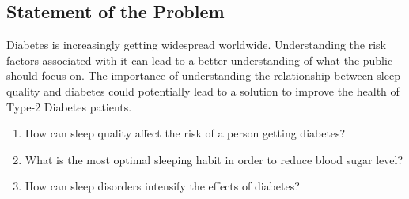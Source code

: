 \subsection*{Statement of the Problem}

Diabetes is increasingly getting widespread worldwide. Understanding the risk
factors associated with it can lead to a better understanding of what the public
should focus on. The importance of understanding the relationship between sleep
quality and diabetes could potentially lead to a solution to improve the health
of Type-2 Diabetes patients.


\begin{enumerate}
    \item How can sleep quality affect the risk of a person getting diabetes?
    \item What is the most optimal sleeping habit in order to reduce blood sugar
level?
    \item How can sleep disorders intensify the effects of diabetes?
\end{enumerate}
